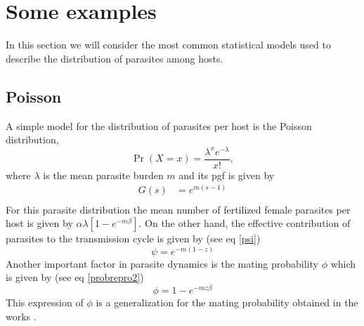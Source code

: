 \documentclass[useAMS,referee,usenatbib]{biom}
\begin{document}
\section{Some examples}\label{sec:ejemplos}
In this section we will consider the most common statistical models used to describe the distribution of parasites among hosts.
\subsection{Poisson}
A simple model for the distribution of parasites per host \cite{lahmar2001frequency} is the Poisson distribution,
\begin{equation}
\Pr(X=x)=\frac {\lambda ^{x}e^{-\lambda }}{x!},
\end{equation}     
where $\lambda$ is the mean parasite burden $m$ and its pgf is given by
\begin{equation}
\begin{split}
G(s)&=e^{m(s-1)}\\
\end{split}
\end{equation}
For this parasite distribution the 
mean number of fertilized female parasites per host is given by
$\alpha \lambda \left[1  -  e^{-m\beta} \right]$.
On the other hand, the effective contribution of parasites to the transmission cycle is given by (see eq \eqref{psi})
%
\begin{equation}
\psi=e^{-m(1-z)}
\end{equation}
Another important factor in parasite dynamics is the mating probability $\phi$ which is given by (see eq \eqref{probrepro2})
%
\begin{equation}
\phi=
1-e^{-mz \beta}
\end{equation}
This expression of $\phi$ is a generalization for the  mating probability obtained in the works \cite{anderson1992infectious,may1993biased,may1977togetherness}. 
\end{document}

